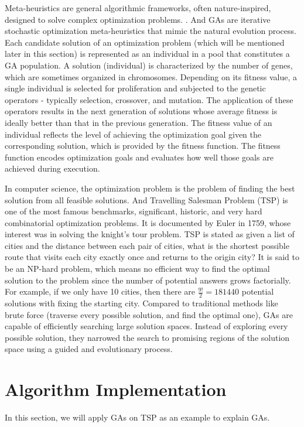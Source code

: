 \documentclass[letterpaper, 12 pt, conference]{ieeeconf}  %
\begin{document}
Meta-heuristics are general algorithmic frameworks, often nature-inspired, designed to solve complex optimization problems. \cite{Lb08}. And GAs are iterative stochastic optimization meta-heuristics that mimic the natural evolution process. Each candidate solution of an optimization problem (which will be mentioned later in this section) is represented as an individual in a pool that constitutes a GA population. A solution (individual) is characterized by the number of genes, which are sometimes organized in chromosomes. Depending on its fitness value, a single individual is selected for proliferation and subjected to the genetic operators - typically selection, crossover, and mutation. The application of these operators results in the next generation of solutions whose average fitness is ideally better than that in the previous generation. The fitness value of an individual reflects the level of achieving the optimization goal given the corresponding solution, which is provided by the fitness function. The fitness function encodes optimization goals and evaluates how well those goals are achieved during execution. \cite{Dp14}

In computer science, the optimization problem is the problem of finding the best solution from all feasible solutions. \cite{wikiop} And Travelling Salesman Problem (TSP) is one of the most famous benchmarks, significant, historic, and very hard combinatorial optimization problems. \cite{Ah17} It is documented by Euler in 1759, whose interest was in solving the knight's tour problem. \cite{Pl99} TSP is stated as given a list of cities and the distance between each pair of cities, what is the shortest possible route that visits each city exactly once and returns to the origin city? It is said to be an NP-hard problem, which means no efficient way to find the optimal solution to the problem since the number of potential answers grows factorially. For example, if we only have 10 cities, then there are $\frac{9!}{2}=181440$ potential solutions with fixing the starting city. Compared to traditional methods like brute force (traverse every possible solution, and find the optimal one), GAs are capable of efficiently searching large solution spaces. Instead of exploring every possible solution, they narrowed the search to promising regions of the solution space using a guided and evolutionary process.


\section{Algorithm Implementation}
\label{sec:rw}
In this section, we will apply GAs on TSP as an example to explain GAs.
\end{document}
